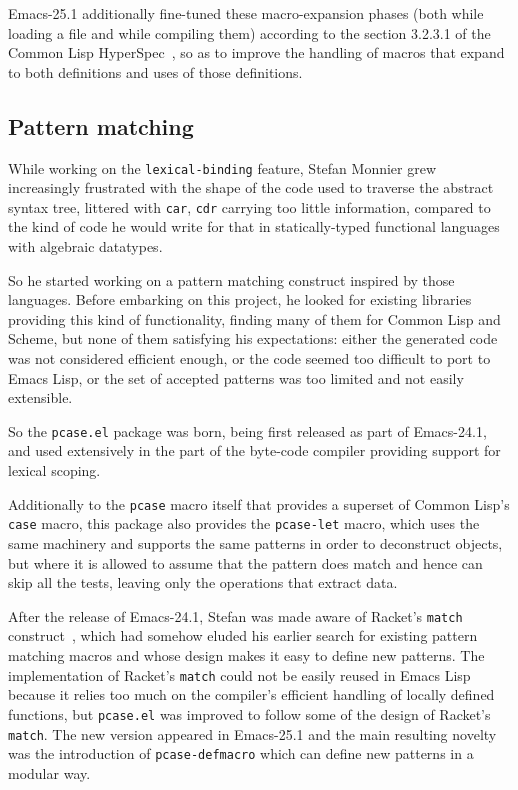 \documentclass[format=acmsmall, review]{acmart}
\newcommand \Elisp {Emacs Lisp}
\begin{document}
Emacs-25.1 additionally fine-tuned these macro-expansion phases (both
while loading a file and while compiling them) according to the section
3.2.3.1 of the Common Lisp HyperSpec~\cite{HyperSpec}, so as to improve the
handling of macros that expand to both definitions and uses of
those definitions.

\subsection{Pattern matching}           %
\label{sec:pcase}

While working on the \texttt{lexical-binding} feature, Stefan Monnier grew
increasingly frustrated with the shape of the code used to traverse the
abstract syntax tree, littered with \texttt{car}, \texttt{cdr} carrying too
little information, compared to the kind of code he would write for that in
statically-typed functional languages with algebraic datatypes.

So he started working on a pattern matching construct inspired by those
languages.  Before embarking on this project, he looked for existing
libraries providing this kind of functionality, finding many of them for
Common Lisp and Scheme, but none of them satisfying his expectations: either
the generated code was not considered efficient enough, or the code seemed
too difficult to port to \Elisp{}, or the set of accepted patterns was too
limited and not easily extensible.

So the \texttt{pcase.el} package was born,
being first released as part of Emacs-24.1, and used extensively in the part
of the byte-code compiler providing support for lexical scoping.

Additionally to the \texttt{pcase} macro itself that provides a superset of
Common Lisp's \texttt{case} macro, this package also provides the
\texttt{pcase-let} macro, which uses the same machinery and supports the same
patterns in order to deconstruct objects, but where it is allowed to assume
that the pattern does match and hence can skip all the tests, leaving only the
operations that extract data.

After the release of Emacs-24.1, Stefan was made aware of Racket's
\texttt{match} construct~\cite{RacketReference2018}, which had somehow eluded
his earlier search for
existing pattern matching macros and whose design makes it easy to define
new patterns.  The implementation of Racket's \texttt{match} could not be
easily reused in \Elisp{} because it relies too much on the compiler's
efficient handling of locally defined functions, but \texttt{pcase.el} was
improved to follow some of the design of Racket's \texttt{match}.
The new version appeared in Emacs-25.1 and the main resulting novelty was the
introduction of \texttt{pcase-defmacro} which can define new patterns
in a modular way. %
\end{document}
